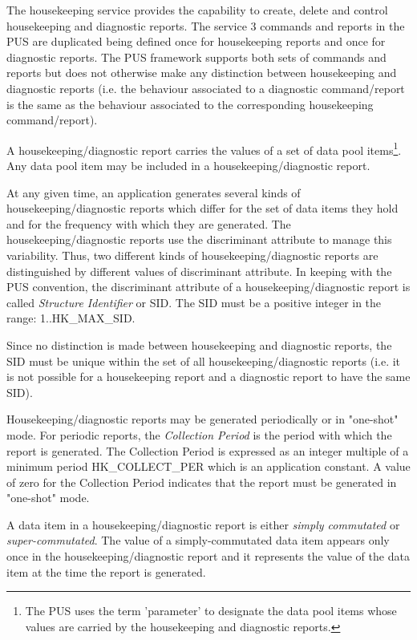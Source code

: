 \documentclass{pnp_article}
\begin{document}
The housekeeping service provides the capability to create, delete and control housekeeping and diagnostic reports. The service 3 commands and reports in the PUS are duplicated being defined once for housekeeping reports and once for diagnostic reports. The PUS framework supports both sets of commands and reports but does not otherwise make any distinction between housekeeping and diagnostic reports (i.e. the behaviour associated to a diagnostic command/report is the same as the behaviour associated to the corresponding housekeeping command/report). 

A housekeeping/diagnostic report carries the values of a set of data pool items\footnote{The PUS uses the term 'parameter' to designate the data pool items whose values are carried by the housekeeping and diagnostic reports.}. Any data pool item may be included in a housekeeping/diagnostic report. 

At any given time, an application generates several kinds of housekeeping/diagnostic reports which differ for the set of data items they hold and for the frequency with which they are generated. The housekeeping/diagnostic reports use the discriminant attribute to manage this variability. Thus, two different kinds of housekeeping/diagnostic reports are distinguished by different values of discriminant attribute. In keeping with the PUS convention, the discriminant attribute of a housekeeping/diagnostic report is called \textit{Structure Identifier} or SID. The SID must be a positive integer in the range: 1..HK\_MAX\_SID.

Since no distinction is made between housekeeping and diagnostic reports, the SID must be unique within the set of all housekeeping/diagnostic reports (i.e. it is not possible for a housekeeping report and a diagnostic report to have the same SID).

Housekeeping/diagnostic reports may be generated periodically or in "one-shot" mode. For periodic reports, the \textit{Collection Period} is the period with which the report is generated. The Collection Period is expressed as an integer multiple of a minimum period HK\_COLLECT\_PER which is an application constant. A value of zero for the Collection Period indicates that the report must be generated in "one-shot" mode.

A data item in a housekeeping/diagnostic report is either \textit{simply commutated} or \textit{super-commutated}. The value of a simply-commutated data item appears only once in the housekeeping/diagnostic report and it represents the value of the data item at the time the report is generated.
\end{document}
